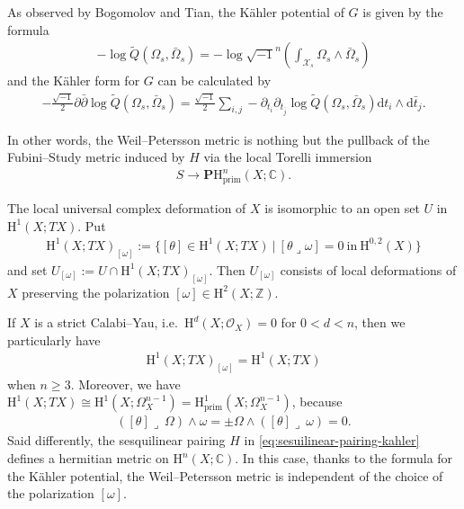 As observed by Bogomolov and Tian, the K\"{a}hler potential of \(G\)
is given by the formula
\begin{eqnarray*}
-\log \tilde{Q}(\Omega_{s},\bar{\Omega}_{s}) = -\log \sqrt{-1}^{n}\left(\int_{\mathcal{X}_{s}}
\Omega_{s}\wedge\bar{\Omega}_{s}\right)
\end{eqnarray*}
and the K\"{a}hler form for \(G\) can be calculated by
\begin{eqnarray*}
-\frac{\sqrt{-1}}{2}\partial\bar{\partial}\log \tilde{Q}(\Omega_{s},\bar{\Omega}_{s})
=\frac{\sqrt{-1}}{2}
\sum_{i,j}-\partial_{t_{i}}\partial_{t_{\bar{j}}}
\log \tilde{Q}(\Omega_{s},\bar{\Omega}_{s})\mathrm{d}t_{i}\wedge\mathrm{d}\bar{t}_{j}.
\end{eqnarray*}

In other words, the Weil--Petersson metric is nothing but
the pullback of the Fubini--Study metric induced by \(H\)
via the local Torelli immersion
\begin{eqnarray*}
S\to \mathbf{P}\mathrm{H}^{n}_{\mathrm{prim}}(X;\mathbb{C}).
\end{eqnarray*}

\begin{remark}
The local universal complex deformation of \(X\) is isomorphic
to an open set \(U\) in \(\mathrm{H}^{1}(X;TX)\). Put
\begin{eqnarray*}
\mathrm{H}^{1}(X;TX)_{[\omega]}:=\{[\theta]\in\mathrm{H}^{1}(X;TX)~|~
[\theta\lrcorner\omega]=0~\mbox{in}~\mathrm{H}^{0,2}(X)\}
\end{eqnarray*}
and set \(U_{[\omega]}:=U\cap \mathrm{H}^{1}(X;TX)_{[\omega]}\).
Then \(U_{[\omega]}\) consists of local deformations of \(X\)
preserving the polarization \([\omega]\in\mathrm{H}^{2}(X;\mathbb{Z})\).

If \(X\) is a strict Calabi--Yau, 
i.e.~\(\mathrm{H}^{d}(X;\mathcal{O}_{X})=0\) for \(0<d<n\), then
we particularly have 
\begin{eqnarray*}
\mathrm{H}^{1}(X;TX)_{[\omega]} = \mathrm{H}^{1}(X;TX)
\end{eqnarray*}
when \(n\ge 3\). Moreover, we have \(\mathrm{H}^{1}(X;TX)\cong
\mathrm{H}^{1}(X;\Omega_{X}^{n-1})=\mathrm{H}^{1}_{\mathrm{prim}}(X;\Omega_{X}^{n-1})\), 
because
\begin{eqnarray*}
([\theta]\lrcorner~\Omega)\wedge\omega = \pm \Omega\wedge ([\theta]\lrcorner~\omega)=0.
\end{eqnarray*}
Said differently, the sesquilinear pairing \(H\) in 
\eqref{eq:sesuilinear-pairing-kahler}
defines a hermitian metric on 
\(\mathrm{H}^{n}(X;\mathbb{C})\).
In this case, thanks to the formula for the 
K\"{a}hler potential, the Weil--Petersson metric is 
independent of the choice of the polarization \([\omega]\).
\end{remark}

